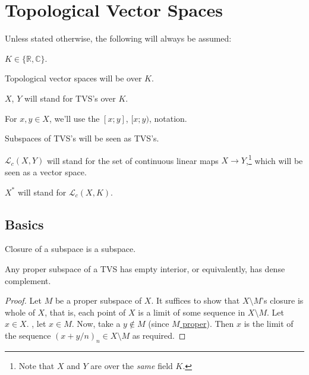 \chapter{Topological Vector Spaces}

\begin{conv}
	Unless stated otherwise, the following will always be assumed:
	\begin{assmplist}
		\item $K\in\{\mathbb{R, C}\}$.
		
		\item Topological vector spaces will be over $K$.
		
		\item $X$, $Y$ will stand for TVS's over $K$.
		
		\item For $x, y\in X$, we'll use the $[x; y]$, $[x; y)$, \etc notation.
		
		\item Subspaces of TVS's will be seen as TVS's.
		
		\item $\mathcal L_c(X, Y)$ will stand for the set of continuous linear maps $X\to Y$,\footnote{Note that $X$ and $Y$ are over the \emph{same} field $K$.} which will be seen as a vector space.
		
		\item $X^*$ will stand for $\mathcal L_c(X, K)$.
	\end{assmplist}
\end{conv}

\section{Basics}

	\begin{lem}
		Closure of a subspace is a subspace.
	\end{lem}
	
	\begin{prp}
		Any proper subspace of a TVS has empty interior, or equivalently, has dense complement.
	\end{prp}
	
	\begin{proof}
		Let $M$ be a proper subspace of $X$. It suffices to show that $X\setminus M$'s closure is whole of $X$, that is, each point of $X$ is a limit of some sequence in $X\setminus M$. Let $x\in X$. \Wlogg, let $x\in M$. Now, take a $y\notin M$ (since \uline{$M$ proper}). Then $x$ is the limit of the sequence $(x + y/n)_n\in X\setminus M$ as required.
	\end{proof}